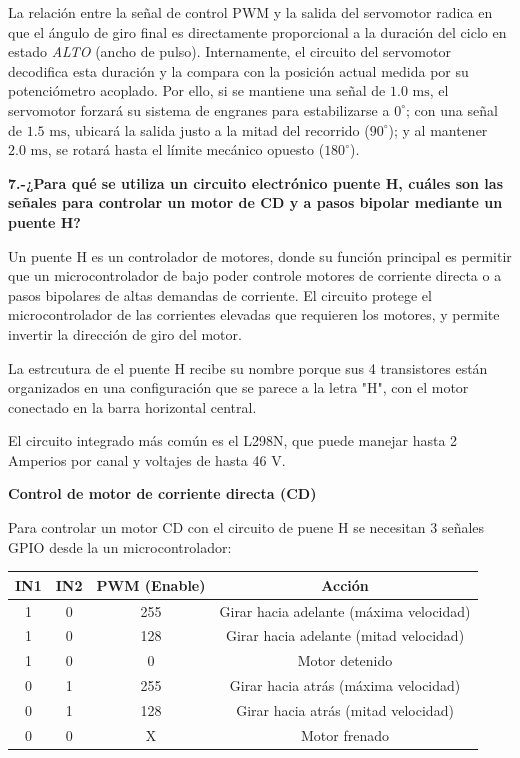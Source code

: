 \documentclass[letterpaper,12pt]{article}
\begin{document}
    La relación entre la señal de control PWM y la salida del servomotor radica en que el ángulo de giro final es directamente proporcional a la duración del ciclo en estado \textit{ALTO} (ancho de pulso). Internamente, el circuito del servomotor decodifica esta duración y la compara con la posición actual medida por su potenciómetro acoplado. Por ello, si se mantiene una señal de $1.0\text{ ms}$, el servomotor forzará su sistema de engranes para estabilizarse a $0^\circ$; con una señal de $1.5\text{ ms}$, ubicará la salida justo a la mitad del recorrido ($90^\circ$); y al mantener $2.0\text{ ms}$, se rotará hasta el límite mecánico opuesto ($180^\circ$). 
    
    
    \noindent\textbf{7.-¿Para qué se utiliza un circuito electrónico puente H, cuáles son las señales para controlar un motor de CD y a pasos bipolar mediante un puente H?}

    Un puente H es un controlador de motores, donde su función principal 
    es permitir que un microcontrolador de bajo poder
    controle motores de corriente directa o a pasos bipolares de
    altas demandas de corriente.
    El circuito protege el microcontrolador de las corrientes elevadas que 
    requieren los motores, y permite invertir la dirección de giro del motor.

    La estrcutura de el puente H recibe su nombre porque sus
    4 transistores
    están organizados en una configuración que se parece a la letra "H",
    con el motor conectado en la barra horizontal central.

    El circuito integrado más común es el L298N, que puede manejar hasta 2 Amperios por canal y voltajes de hasta 46 V.


    \textbf{Control de motor de corriente directa (CD)}

    Para controlar un motor CD con el circuito de puene H se necesitan 3 señales GPIO desde la un microcontrolador:

    \begin{center}
    \begin{tabular}{|c|c|c|c|}
    \hline
    \textbf{IN1} & \textbf{IN2} & \textbf{PWM (Enable)} & \textbf{Acción} \\
    \hline
    1 & 0 & 255 & Girar hacia adelante (máxima velocidad) \\
    \hline
    1 & 0 & 128 & Girar hacia adelante (mitad velocidad) \\
    \hline
    1 & 0 & 0 & Motor detenido \\
    \hline
    0 & 1 & 255 & Girar hacia atrás (máxima velocidad) \\
    \hline
    0 & 1 & 128 & Girar hacia atrás (mitad velocidad) \\
    \hline
    0 & 0 & X & Motor frenado \\
    \hline
    \end{tabular}
    \end{center}
\end{document}
